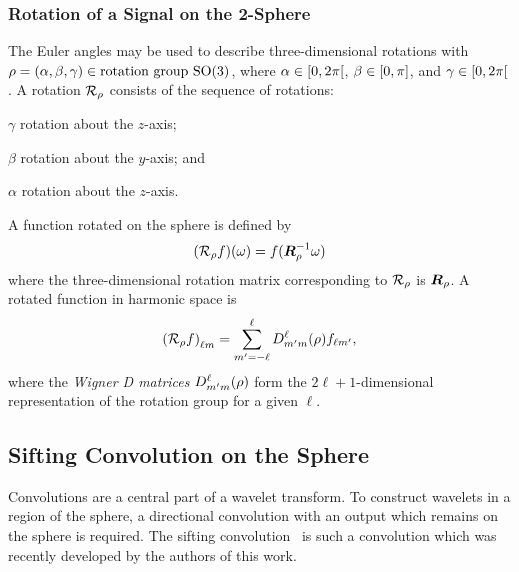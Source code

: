 \subsubsection{Rotation of a Signal on the 2-Sphere}

The Euler angles may be used to describe three-dimensional rotations with \(\rho = (\alpha,\beta,\gamma) \in \text{rotation group } \text{SO(3)}{}\), where \(\alpha \in \interval[open right]{0}{2\pi}\), \(\beta \in \interval{0}{\pi}\), and \(\gamma \in \interval[open right]{0}{2\pi}\).
A rotation \(\mathcal{R}_{\rho}\) consists of the sequence of rotations:
%
\begin{inparaenum}[(i)]
	\item \({\gamma}\) rotation about the \(z\)-axis;
	\item \({\beta}\) rotation about the \(y\)-axis; and
	\item \({\alpha}\) rotation about the \(z\)-axis.
\end{inparaenum}
%
A function rotated on the sphere is defined by
%
\begin{equation}
	(\mathcal{R}_{\rho}f)(\omega)
	= f(\vb*{R}_{\rho}^{-1} \omega)
\end{equation}
%
where the three-dimensional rotation matrix corresponding to \(\mathcal{R}_{\rho}\) is \(\vb*{R}_{\rho}\).
A rotated function in harmonic space is
%
\begin{equation}
	{(\mathcal{R}_{\rho}f)}_{\ell m}
	= \sum\limits_{m'=-\ell}^{\ell} D^{\ell}_{m'm}(\rho) f_{\ell m'},
\end{equation}
%
where the \emph{Wigner D matrices} \(D^{\ell}_{m'm}(\rho)\) form the \(2\ell+1\)-dimensional representation of the rotation group for a given \({\ell}\).

\subsection{Sifting Convolution on the Sphere}\label{sec:chapter4_sifting_convolution_sphere}

Convolutions are a central part of a wavelet transform.
To construct wavelets in a region of the sphere, a directional convolution with an output which remains on the sphere is required.
The sifting convolution~\autocite{Roddy2021} is such a convolution which was recently developed by the authors of this work.

